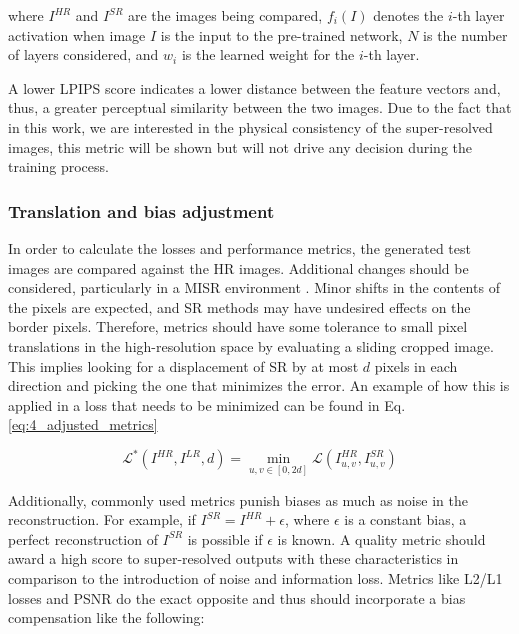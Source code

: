         where $I^{HR}$ and $I^{SR}$ are the images being compared, $f_i(I)$ denotes the $i$-th layer activation when image $I$ is the input to the pre-trained network, $N$ is the number of layers considered, and $w_i$ is the learned weight for the $i$-th layer.
        
        A lower LPIPS score indicates a lower distance between the feature vectors and, thus, a greater perceptual similarity between the two images. 
        Due to the fact that in this work, we are interested in the physical consistency of the super-resolved images, 
        this metric will be shown but will not drive any decision during the training process.
        

        \subsubsection{Translation and bias adjustment}\label{subsec:adjustedmetrics}
    
            In order to calculate the losses and performance metrics, the generated test images are compared against the HR images.
            Additional changes should be considered, particularly in a MISR environment \cite{martens2019superresolution}.
            Minor shifts in the contents of the pixels are expected, and  SR methods may have undesired effects on the border pixels. Therefore, metrics should have some tolerance to small pixel translations in the high-resolution space by evaluating a sliding cropped image. 
            This implies looking for a displacement of SR by at most $d$ pixels in each direction and picking the one that minimizes the error. 
            An example of how this is applied in a loss that needs to be minimized can be found in Eq. \ref{eq:4_adjusted_metrics}
    
            \begin{equation}
               \mathcal{L}^* ( I^{HR}, I^{LR}, d) = \min_{u,v \in [0,2d]} \mathcal{L} ( I^{HR}_{u,v}, I^{SR}_{u,v})
            \label{eq:4_adjusted_metrics}
            \end{equation}
    
            Additionally, commonly used metrics punish biases as much as noise in the reconstruction.
            For example, if $I^{SR} = I^{HR} + \epsilon$, where $\epsilon$ is a constant bias, a perfect reconstruction of $I^{SR}$ is possible if $\epsilon$ is known. 
            A quality metric should award a high score to super-resolved outputs with these characteristics in comparison to the introduction of noise and information loss. Metrics like L2/L1 losses and PSNR do the exact opposite and thus should incorporate a bias compensation like the following: 
    
